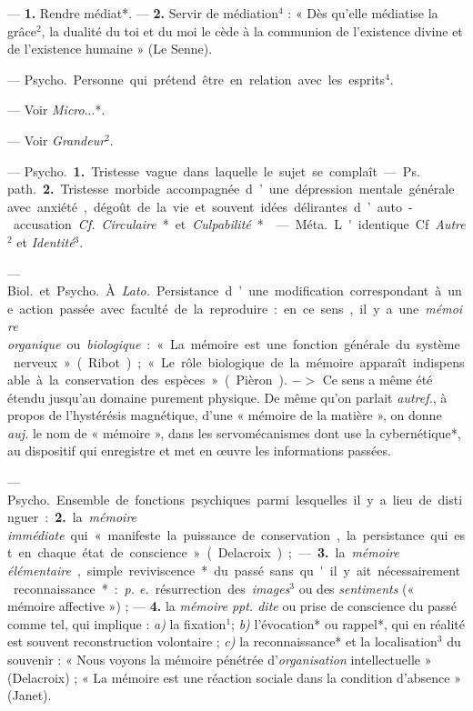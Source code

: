 \begin{itemize}[leftmargin=1cm, label=, itemsep=1pt]
 — {\bf 1.} Rendre médiat*. —  {\bf 2.} Servir de
médiation$^4$ : « Dès
qu'elle médiatise la grâce$^2$, la dualité du toi et du moi le cède à la
communion de l'existence divine et de l’existence humaine » (Le Senne).

 — \si{Psycho.} Personne qui prétend être en relation avec les
esprits$^4$.

 — Voir {\it Micro}...*.

 — Voir {\it Grandeur}$^2$.

 — \si{Psycho.} {\bf 1.} Tristesse vague dans laquelle le
sujet se complaît. — \si{Ps. path.} {\bf 2.} Tristesse morbide accompagnée
d’une dépression mentale générale avec anxiété, dégoût de la vie et souvent
idées délirantes d’auto-accusation. {\it Cf.} {\it Circulaire}* et
{\it Culpabilité}*.

 — \si{Méta.} L'identique. Cf. {\it Autre}$^2$ et
{\it Identité}$^3$.

 — \si{Biol.} et \si{Psycho.} À. {\it Lato.} Persistance d’une
modification correspondant à une action passée avec faculté de la
reproduire : en ce sens, il y a une {\it mémoire organique} ou
{\it biologique} : « La mémoire est une fonction générale du système
nerveux » (Ribot) ; « Le rôle biologique de la mémoire apparaît indispensable
à la conservation des espèces » (Pièron). $->$ Ce sens a même été étendu
jusqu’au domaine purement physique. De même qu’on parlait {\it autref.}, à
propos de l'hystérésis magnétique, d’une « mémoire de la matière », on donne
{\it auj.} le nom de « mémoire », dans les servomécanismes dont use la
cybernétique*, au dispositif qui enregistre et met en œuvre les informations
passées.

— \si{Psycho.} Ensemble de fonctions psychiques parmi lesquelles il y a lieu
de distinguer : {\bf 2.} la {\it mémoire immédiate} qui « manifeste la
puissance de conservation, la persistance qui
est en chaque état de conscience » (Delacroix) ; — {\bf 3.} la {\it mémoire
élémentaire}, simple reviviscence* du passé sans qu'il y ait nécessairement
reconnaissance* : {\it p. e.} résurrection des {\it images}$^3$ ou des
{\it sentiments} (« mémoire affective ») ; — {\bf 4.} la {\it mémoire ppt.
dite} ou prise de conscience du passé comme tel, qui implique : {\it a)} la
fixation$^1$; {\it b)} l’évocation* ou rappel*, qui en réalité est souvent
reconstruction volontaire ; {\it c)} la reconnaissance* et la localisation$^3$
du souvenir : « Nous voyons la mémoire pénétrée d'{\it organisation}
intellectuelle » (Delacroix) ; « La mémoire est une réaction sociale dans la
condition d'absence » (Janet).


\end{itemize}
